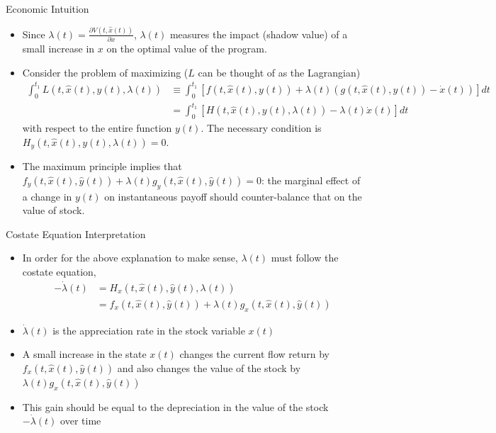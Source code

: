 \documentclass[9pt,aspectratio=169]{beamer}
\begin{document}
\begin{frame}{Economic Intuition}
    \begin{itemize}
        \item Since $\lambda(t) = \frac{\partial V(t, \hat{x}(t))}{\partial
          x}$, $\lambda(t)$ measures the impact (shadow value) of a small
        increase in $x$ on the optimal value of the program.
        \item Consider the problem of maximizing ($L$ can be thought of as
        the Lagrangian)
        \begin{align*}
            \int_0^{t_1} L(t, \hat x(t), y(t), \lambda(t)) &\equiv \int_0^{t_1}
            \left[f(t, \hat{x}(t), y(t)) + \lambda(t)\left( g(t,
                    \hat{x}(t), y(t)) - \dot x(t) \right)\right]dt\\
            &= \int_0^{t_1} \left[H(t, \hat{x}(t), y(t), \lambda(t)) - \lambda(t)
            \dot x(t)\right] dt
        \end{align*}
        with respect to the entire function $y(t)$. The necessary condition
        is $H_y(t, \hat{x}(t), y(t), \lambda(t)) = 0$.
        \item The maximum principle implies that $f_y(t, \hat x(t), \hat
        y(t)) + \lambda(t) g_y(t, \hat x(t), \hat y(t)) = 0$: the marginal
        effect of a change in $y(t)$ on instantaneous payoff should
        counter-balance that on the value of stock.
    \end{itemize}
\end{frame}

\begin{frame}{Costate Equation Interpretation}
\begin{itemize}
    \item In order for the above explanation to make sense, $\lambda(t)$ must
    follow the costate equation,
    \begin{align*}
        -\dot{\lambda}(t) &= H_x(t, \hat{x}(t), \hat{y}(t), \lambda(t)) \\
        &= f_x(t, \hat{x}(t), \hat{y}(t)) + \lambda(t)g_x(t, \hat{x}(t), \hat{y}(t))
    \end{align*}
    \item $\dot{\lambda}(t)$ is the appreciation rate in the stock variable
    $x(t)$
    \item A small increase in the state $x(t)$ changes the current flow
    return by $f_x(t, \hat{x}(t), \hat{y}(t))$ and also changes the value of
    the stock by $\lambda(t)g_x(t, \hat{x}(t), \hat{y}(t))$
    \item This gain should be equal to the depreciation in the value of the
    stock $-\dot{\lambda}(t)$ over time
\end{itemize}
\end{frame}
\end{document}
